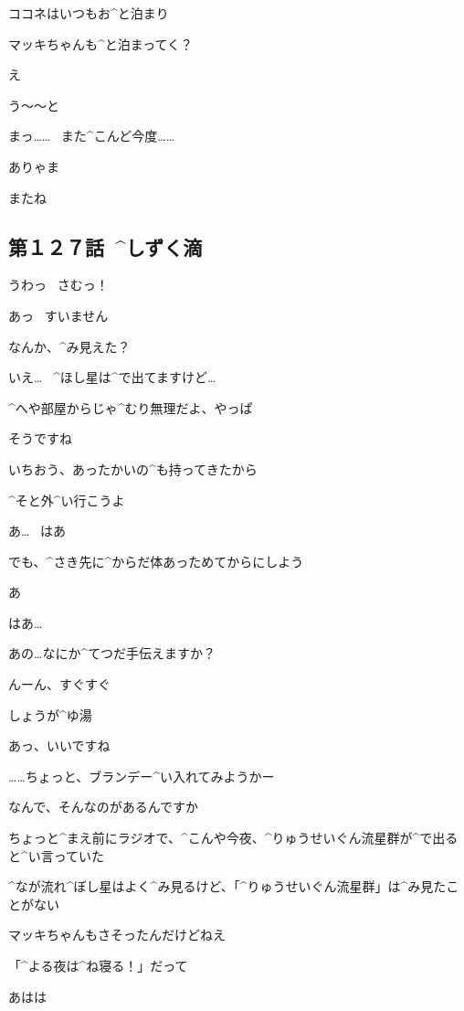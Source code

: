\Alpha ココネはいつもお^{と}{泊}まり

\Alpha マッキちゃんも^{と}{泊}まってく？

\Makki え

\page
\Makki う〜〜と

\Makki まっ……
\ また^{こんど}{今度}……

\Alpha ありゃま

\Kokone またね


\subsection{第１２７話\ ^{しずく}{滴}}

\page[101]
\Alpha うわっ
\ さむっ！

\Kokone あっ
\ すいません

\Alpha なんか、^{み}{見}えた？

\Kokone いえ…
\ ^{ほし}{星}は^{で}{出}てますけど…

\Alpha ^{へや}{部屋}からじゃ^{むり}{無理}だよ、やっぱ

\Kokone そうですね

\page
\Alpha いちおう、あったかいの^{も}{持}ってきたから

\Alpha ^{そと}{外}^{い}{行}こうよ

\Kokone あ…
\ はあ

\Alpha でも、^{さき}{先}に^{からだ}{体}あっためてからにしよう

\Kokone あ

\Kokone はあ…

\Kokone あの…なにか^{てつだ}{手伝}えますか？

\Alpha んーん、すぐすぐ

\page
\Alpha しょうが^{ゆ}{湯}

\Kokone あっ、いいですね

\Alpha ……ちょっと、ブランデー^{い}{入}れてみようかー

\Kokone なんで、そんなのがあるんですか

\page
\Alpha ちょっと^{まえ}{前}にラジオで、^{こんや}{今夜}、^{りゅうせいぐん}{流星群}が^{で}{出}ると^{い}{言}っていた

\Alpha ^{なが}{流}れ^{ぼし}{星}はよく^{み}{見}るけど、「^{りゅうせいぐん}{流星群}」は^{み}{見}たことがない

\Alpha マッキちゃんもさそったんだけどねえ

\Alpha 「^{よる}{夜}は^{ね}{寝}る！」だって

\Kokone あはは

